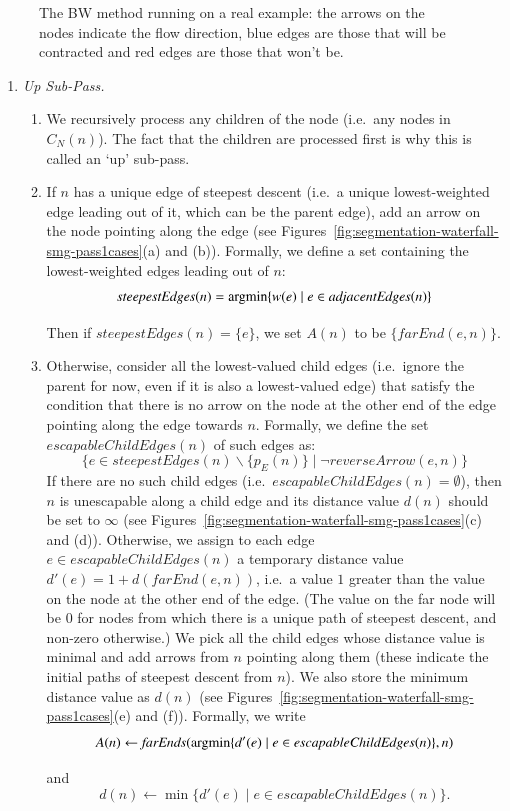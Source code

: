 \documentclass[preprint,a4paper]{elsarticle}
\newcommand{\argmin}{\operatornamewithlimits{argmin}}
\newcommand{\funcname}[1]{\mathit{#1}}
\newenvironment{stusubfig}[1]
{
	\begin{figure}[#1]
	\begin{center}
}
{
	\end{center}
	\end{figure}
}
\begin{document}
\begin{stusubfig}{!t}
\caption[The BW method running on a real example]{The BW method running on a real example: the arrows on the nodes indicate the flow direction, blue edges are those that will be contracted and red edges are those that won't be.}
\label{fig:segmentation-waterfall-smg-example}
\end{stusubfig}

\begin{enumerate}

\item \emph{Up Sub-Pass.}

\begin{enumerate}
\item We recursively process any children of the node (i.e.~any nodes in $C_N(n)$). The fact that the children are processed first is why this is called an `up' sub-pass.

\item If $n$ has a unique edge of steepest descent (i.e.~a unique lowest-weighted edge leading out of it, which can be the parent edge), add an arrow on the node pointing along the edge (see Figures~\ref{fig:segmentation-waterfall-smg-pass1cases}(a) and (b)). Formally, we define a set containing the lowest-weighted edges leading out of $n$:
%
\[
\funcname{steepestEdges}(n) = \argmin_{}\{w(e) \; | \; e \in \funcname{adjacentEdges}(n)\}
\]
%
Then if $\funcname{steepestEdges}(n) = \{e\}$, we set $A(n)$ to be $\{\funcname{farEnd}(e,n)\}$.

\item Otherwise, consider all the lowest-valued child edges (i.e.~ignore the parent for now, even if it is also a lowest-valued edge) that satisfy the condition that there is no arrow on the node at the other end of the edge pointing along the edge towards $n$. Formally, we define the set $\funcname{escapableChildEdges}(n)$ of such edges as:
%
\[
\{e \in \funcname{steepestEdges}(n) \backslash \{p_E(n)\} \; | \; \neg \funcname{reverseArrow}(e,n)\}
\]
%
If there are no such child edges (i.e.~$\funcname{escapableChildEdges}(n) = \emptyset$), then $n$ is unescapable along a child edge and its distance value $d(n)$ should be set to $\infty$ (see Figures~\ref{fig:segmentation-waterfall-smg-pass1cases}(c) and (d)). Otherwise, we assign to each edge $e \in \funcname{escapableChildEdges}(n)$ a temporary distance value $d'(e) = 1 + d(\funcname{farEnd}(e,n))$, i.e.~a value $1$ greater than the value on the node at the other end of the edge. (The value on the far node will be $0$ for nodes from which there is a unique path of steepest descent, and non-zero otherwise.) We pick all the child edges whose distance value is minimal and add arrows from $n$ pointing along them (these indicate the initial paths of steepest descent from $n$). We also store the minimum distance value as $d(n)$ (see Figures~\ref{fig:segmentation-waterfall-smg-pass1cases}(e) and (f)). Formally, we write
%
\[
A(n) \leftarrow \funcname{farEnds}(\argmin_{}\{d'(e) \; | \; e \in \funcname{escapableChildEdges}(n)\}, n)
\]
%
and
\[
d(n) \leftarrow \min_{}\{d'(e) \; | \; e \in \funcname{escapableChildEdges}(n)\}.
\]


\end{enumerate}
\end{enumerate}
\end{document}
